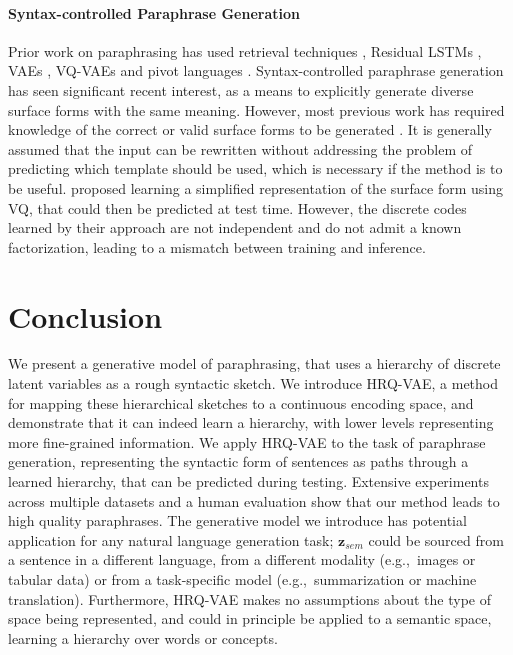 \documentclass[11pt]{article}
\begin{document}
\paragraph{Syntax-controlled Paraphrase Generation}





Prior work on paraphrasing has used retrieval techniques \cite{barzilay-mckeown-2001-extracting}, Residual LSTMs \cite{prakash-etal-2016-neural}, VAEs \cite{bowman-etal-2016-generating}, VQ-VAEs
\cite{roy-grangier-2019-unsupervised} and pivot languages \cite{mallinson-etal-2017-paraphrasing}. Syntax-controlled paraphrase generation has seen significant recent interest, as a means to explicitly generate diverse surface forms with the same meaning. However, most previous work has required knowledge of the correct or valid surface forms to be generated \cite{iyyer-etal-2018-adversarial,chen-etal-2019-controllable,sgcp2020,meng2021conrpg}. It is generally assumed that the input can be rewritten without addressing the problem of predicting which template should be used, which is necessary if the method is to be useful. \citet{hosking-lapata-2021-factorising} proposed learning a simplified representation of the surface form using VQ, that could then be predicted at test time. However, the discrete codes learned by their approach are not independent and do not admit a known factorization, leading to a mismatch between training and inference. 






\section{Conclusion}

We present a generative model of paraphrasing, that uses a hierarchy of discrete latent variables as a rough syntactic sketch. We introduce HRQ-VAE, a method for mapping these hierarchical sketches to a continuous encoding space, and demonstrate that it can indeed learn a hierarchy, with lower levels representing more fine-grained information. We apply HRQ-VAE to the task of paraphrase generation, representing the syntactic form of sentences as paths through a learned hierarchy, that can be predicted during testing. Extensive experiments across multiple datasets and a human evaluation show that our method leads to high quality paraphrases. The generative model we introduce has potential application for any natural language generation task; $\textbf{z}_{sem}$ could be sourced from a sentence in a different language, from a different modality (e.g.,~images or tabular data) or from a task-specific model (e.g.,~summarization or machine translation). 
Furthermore, HRQ-VAE makes no assumptions about the type of space being represented, and could in principle be applied to a semantic space, learning a hierarchy over words or concepts.
\end{document}
